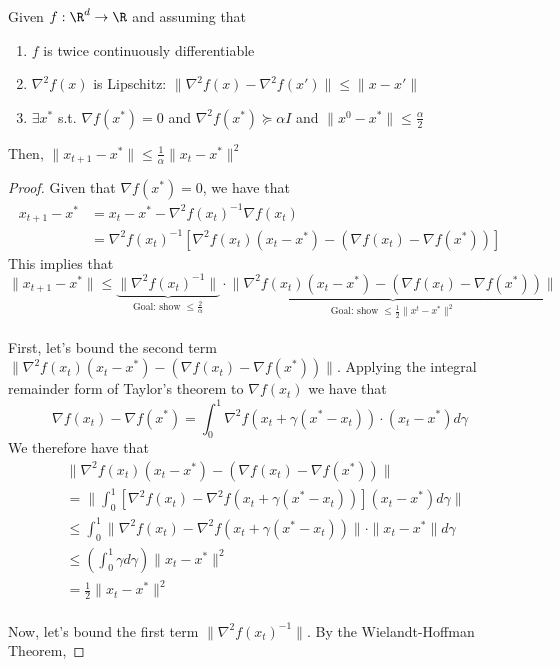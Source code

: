 \begin{theorem}
Given $f: \R^d \rightarrow \R$ and assuming that
\begin{enumerate}
\item $f$ is twice continuously differentiable
\item $\nabla^2 f(x)$ is Lipschitz: $\| \nabla^2 f(x) - \nabla^2 f(x') \| \leq \|x-x'\|$
\item $\exists x^*$ s.t. $\nabla f(x^*) = 0$ and $\nabla^2 f(x^*) \succeq \alpha I$ and $\|x^0 - x^*\| \leq \frac{\alpha}{2}$
\end{enumerate}
Then, $\|x_{t+1} - x^*\| \leq \frac{1}{\alpha} \|x_t - x^*\|^2$
\end{theorem}

\begin{proof}
Given that $\nabla f(x^*) = 0$, we have that
\begin{align*}
x_{t+1} - x^* &= x_t - x^* - \nabla^2 f(x_t)^{-1} \nabla f(x_t) \\
&= \nabla^2 f(x_t)^{-1} [\nabla^2 f(x_t)(x_t - x^*) - (\nabla f(x_t) - \nabla f(x^*))]
\end{align*}
This implies that
$$\|x_{t+1} - x^* \| \leq \underbrace{\| \nabla^2 f(x_t)^{-1} \|}_{\text{Goal: show $\leq \frac{2}{\alpha}$}} \cdot \underbrace{\|\nabla^2 f(x_t)(x_t - x^*) - (\nabla f(x_t) - \nabla f(x^*))\|}_{\text{Goal: show $\leq \frac{1}{2} \| x^t - x^* \|^2$}}$$
\\
First, let's bound the second term $\|\nabla^2 f(x_t)(x_t - x^*) - (\nabla f(x_t) - \nabla f(x^*))\|$.
Applying the integral remainder form of Taylor's theorem to $\nabla f(x_t)$ we have that
$$\nabla f(x_t) - \nabla f(x^*) = \int_{0}^{1} \nabla^2 f(x_t + \gamma (x^* - x_t)) \cdot (x_t - x^*) d\gamma$$
We therefore have that
\begin{align*}
&\|\nabla^2 f(x_t)(x_t - x^*) - (\nabla f(x_t) - \nabla f(x^*))\| \\
&= \|\int_{0}^{1} [\nabla^2 f(x_t) - \nabla^2 f(x_t + \gamma (x^* - x_t))](x_t - x^*) d\gamma \| \\
&\leq \int_{0}^{1} \|\nabla^2 f(x_t) - \nabla^2 f(x_t + \gamma (x^* - x_t))\| \cdot \|x_t - x^*\| d\gamma \\
&\leq \left( \int_{0}^{1} \gamma d\gamma \right) \|x_t - x^*\|^2 \tag{$\nabla^2 f(x_t)$ is Lipschitz}\\
&= \frac{1}{2}\|x_t - x^*\|^2
\end{align*}
\\
Now, let's bound the first term $\|\nabla^2 f(x_t)^{-1}\|$. By the Wielandt-Hoffman Theorem,

\end{proof}
